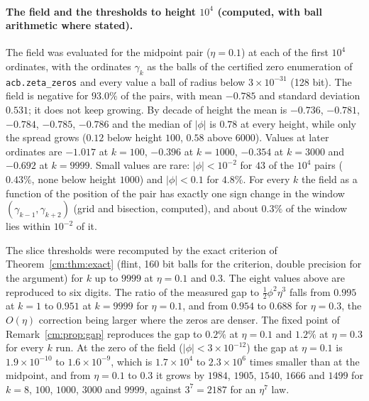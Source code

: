 \paragraph{The field and the thresholds to height $10^4$ (computed, with ball arithmetic where stated).} The field was evaluated for the midpoint pair ($\eta=0.1$) at each of the first $10^4$ ordinates, with the ordinates $\gamma_k$ as the balls of the certified zero enumeration of \texttt{acb.zeta\_zeros} and every value a ball of radius below $3\times10^{-31}$ (128 bit). The field is negative for $93.0\%$ of the pairs, with mean $-0.785$ and standard deviation $0.531$; it does not keep growing. By decade of height the mean is $-0.736$, $-0.781$, $-0.784$, $-0.785$, $-0.786$ and the median of $|\phi|$ is $0.78$ at every height, while only the spread grows ($0.12$ below height $100$, $0.58$ above $6000$). Values at later ordinates are $-1.017$ at $k=100$, $-0.396$ at $k=1000$, $-0.354$ at $k=3000$ and $-0.692$ at $k=9999$. Small values are rare: $|\phi|<10^{-2}$ for $43$ of the $10^4$ pairs ($0.43\%$, none below height $1000$) and $|\phi|<0.1$ for $4.8\%$. For every $k$ the field as a function of the position of the pair has exactly one sign change in the window $(\gamma_{k-1},\gamma_{k+2})$ (grid and bisection, computed), and about $0.3\%$ of the window lies within $10^{-2}$ of it.

The slice thresholds were recomputed by the exact criterion of Theorem~\ref{cm:thm:exact} (flint, 160 bit balls for the criterion, double precision for the argument) for $k$ up to $9999$ at $\eta=0.1$ and $0.3$. The eight values above are reproduced to six digits. The ratio of the measured gap to $\frac12\phi^2\eta^3$ falls from $0.995$ at $k=1$ to $0.951$ at $k=9999$ for $\eta=0.1$, and from $0.954$ to $0.688$ for $\eta=0.3$, the $O(\eta)$ correction being larger where the zeros are denser. The fixed point of Remark~\ref{cm:prop:gap} reproduces the gap to $0.2\%$ at $\eta=0.1$ and $1.2\%$ at $\eta=0.3$ for every $k$ run. At the zero of the field ($|\phi|<3\times10^{-12}$) the gap at $\eta=0.1$ is $1.9\times10^{-10}$ to $1.6\times10^{-9}$, which is $1.7\times10^4$ to $2.3\times10^6$ times smaller than at the midpoint, and from $\eta=0.1$ to $0.3$ it grows by $1984$, $1905$, $1540$, $1666$ and $1499$ for $k=8$, $100$, $1000$, $3000$ and $9999$, against $3^7=2187$ for an $\eta^7$ law.

